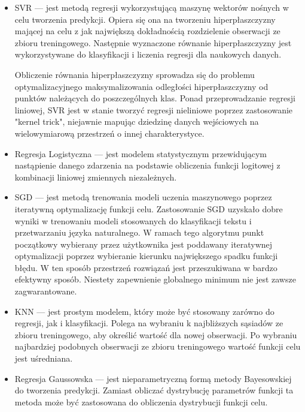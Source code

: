 \begin{itemize}
    \item SVR — jest metodą regresji wykorzystującą maszynę wektorów nośnych w celu tworzenia
    predykcji. Opiera się ona na tworzeniu hiperpłaszczyzny mającej na celu z jak największą
    dokładnością rozdzielenie obserwacji ze zbioru treningowego. Następnie wyznaczone
    równanie hiperpłaszczyzny jest wykorzystywane do klasyfikacji i liczenia regresji dla naukowych
    danych.

    Obliczenie równania hiperpłaszczyzny sprowadza się do problemu optymalizacyjnego
    maksymalizowania odległości hiperpłaszczyzny od punktów należących do poszczególnych klas.
    Ponad przeprowadzanie regresji liniowej, SVR jest w stanie tworzyć regresji nieliniowe
    poprzez zastosowanie "kernel trick", niejawnie mapując dziedzinę danych wejściowych na 
    wielowymiarową przestrzeń o innej charakterystyce.
    
    \item Regresja Logistyczna — jest modelem statystycznym przewidującym nastąpienie danego
    zdarzenia na podstawie obliczenia funkcji logitowej z kombinacji liniowej zmiennych 
    niezależnych.

    \item SGD — jest metodą trenowania modeli uczenia maszynowego poprzez iteratywną optymalizację
    funkcji celu. Zastosowanie SGD uzyskało dobre wyniki w trenowaniu modeli stosowanych
    do klasyfikacji tekstu i przetwarzaniu języka naturalnego. W ramach tego algorytmu
    punkt początkowy wybierany przez użytkownika jest poddawany iteratywnej optymalizacji
    poprzez wybieranie kierunku największego spadku funkcji błędu. W ten sposób przestrzeń rozwiązań
    jest przeszukiwana w bardzo efektywny sposób. Niestety zapewnienie globalnego minimum
    nie jest zawsze zagwarantowane.

    \item KNN — jest prostym modelem, który może być stosowany zarówno do regresji, jak i klasyfikacji.
    Polega na wybraniu k najbliższych sąsiadów ze zbioru treningowego, aby określić wartość dla nowej
    obserwacji. Po wybraniu najbardziej podobnych obserwacji ze zbioru treningowego wartość funkcji
    celu jest uśredniana.

    \item Regresja Gaussowska — jest nieparametryczną formą metody Bayesowskiej do tworzenia
    predykcji. Zamiast obliczać dystrybucję parametrów funkcji ta metoda może być zastosowana do
    obliczenia dystrybucji funkcji celu.
    

\end{itemize}
